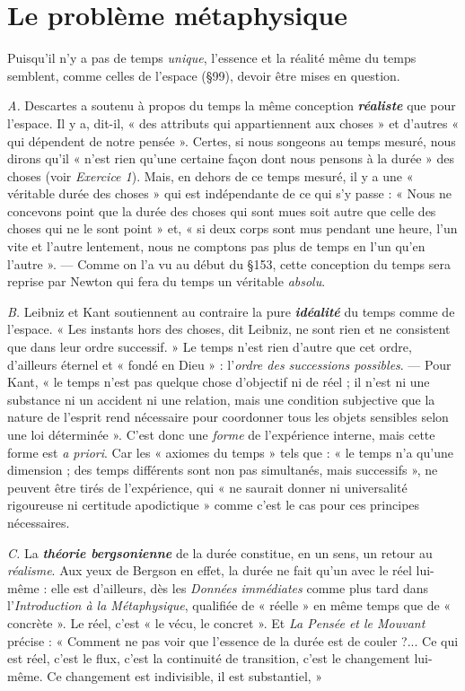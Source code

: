 \section{Le problème métaphysique}%
Puisqu’il n’y a pas de
temps {\it unique}, l’essence et la réalité même du temps semblent, comme
celles de l’espace (\S 99), devoir être mises en question.

{\it A.} Descartes a soutenu à propos du temps la même conception
\textbf{\textit {réaliste}} que pour l’espace. Il y a, dit-il, « des attributs qui appartiennent
aux choses » et d’autres « qui dépendent de notre pensée ».
Certes, si nous songeons au temps mesuré, nous dirons qu’il « n’est
rien qu’une certaine façon dont nous pensons à la durée » des choses
(voir {\it Exercice 1}). Mais, en dehors de ce temps mesuré, il y a une
« véritable durée des choses » qui est indépendante de ce qui s’y
passe : « Nous ne concevons point que la durée des choses qui sont
mues soit autre que celle des choses qui ne le sont point » et, « si deux
corps sont mus pendant une heure, l’un vite et l’autre lentement,
nous ne comptons pas plus de temps en l’un qu’en l’autre ». —
Comme on l’a vu au début du \S 153, cette conception du temps sera
reprise par Newton qui fera du temps un véritable {\it absolu}.

{\it B.} Leibniz et Kant soutiennent au contraire la pure \textbf{\textit {idéalité}} du
temps comme de l’espace. « Les instants hors des choses, dit Leibniz,
ne sont rien et ne consistent que dans leur ordre successif. » Le temps
n’est rien d’autre que cet ordre, d’ailleurs éternel et « fondé en Dieu » :
l’{\it ordre des successions possibles}. — Pour Kant, « le temps n’est pas
quelque chose d’objectif ni de réel ; il n’est ni une substance ni un
accident ni une relation, mais une condition subjective que la nature
de l'esprit rend nécessaire pour coordonner tous les objets sensibles
selon une loi déterminée ». C’est donc une {\it forme} de l’expérience
interne, mais cette forme est {\it a priori}. Car les « axiomes du temps » tels
que : « le temps n’a qu’une dimension ; des temps différents sont non
pas simultanés, mais successifs », ne peuvent être tirés de l’expérience,
qui « ne saurait donner ni universalité rigoureuse ni certitude apodictique »
comme c’est le cas pour ces principes nécessaires.

{\it C.} La \textbf{\textit {théorie bergsonienne}} de la durée constitue, en un sens, un
retour au {\it réalisme}. Aux yeux de Bergson en effet, la durée ne fait
qu'un avec le réel lui-même : elle est d’ailleurs, dès les {\it Données immédiates}
comme plus tard dans l’{\it Introduction à la Métaphysique}, qualifiée
de « réelle » en même temps que de « concrète ». Le réel, c’est « le
vécu, le concret ». Et {\it La Pensée et le Mouvant} précise : « Comment ne
pas voir que l’essence de la durée est de couler ?... Ce qui est réel,
c’est le flux, c’est la continuité de transition, c’est le changement lui-même.
Ce changement est indivisible, il est substantiel, »

